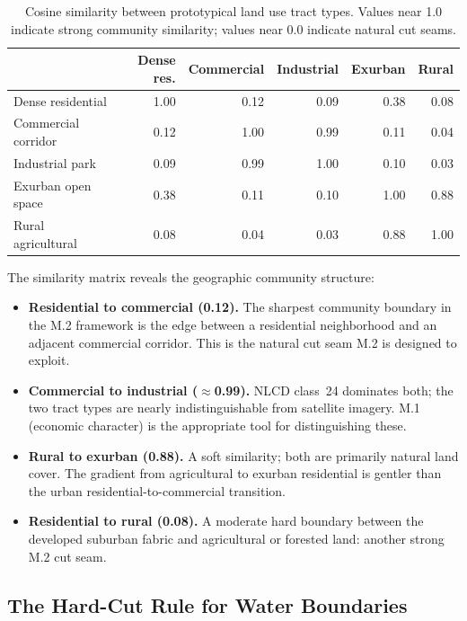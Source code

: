 \begin{table}[ht]
\centering
\caption{Cosine similarity between prototypical land use tract types.
  Values near 1.0 indicate strong community similarity; values near 0.0
  indicate natural cut seams.}
\label{tab:landuse-similarity}
\small
\begin{tabular}{lrrrrr}
\toprule
 & Dense res. & Commercial & Industrial & Exurban & Rural \\
\midrule
Dense residential & 1.00 & 0.12 & 0.09 & 0.38 & 0.08 \\
Commercial corridor & 0.12 & 1.00 & 0.99 & 0.11 & 0.04 \\
Industrial park & 0.09 & 0.99 & 1.00 & 0.10 & 0.03 \\
Exurban open space & 0.38 & 0.11 & 0.10 & 1.00 & 0.88 \\
Rural agricultural & 0.08 & 0.04 & 0.03 & 0.88 & 1.00 \\
\bottomrule
\end{tabular}
\end{table}

The similarity matrix reveals the geographic community structure:
\begin{itemize}
  \item \textbf{Residential to commercial (0.12).}
    The sharpest community boundary in the M.2 framework is the edge between
    a residential neighborhood and an adjacent commercial corridor.
    This is the natural cut seam M.2 is designed to exploit.
  \item \textbf{Commercial to industrial ($\approx$0.99).}
    NLCD class~24 dominates both; the two tract types are nearly
    indistinguishable from satellite imagery.
    M.1 (economic character) is the appropriate tool for distinguishing these.
  \item \textbf{Rural to exurban (0.88).}
    A soft similarity; both are primarily natural land cover.
    The gradient from agricultural to exurban residential is gentler than
    the urban residential-to-commercial transition.
  \item \textbf{Residential to rural (0.08).}
    A moderate hard boundary between the developed suburban fabric and
    agricultural or forested land: another strong M.2 cut seam.
\end{itemize}

\subsection{The Hard-Cut Rule for Water Boundaries}

